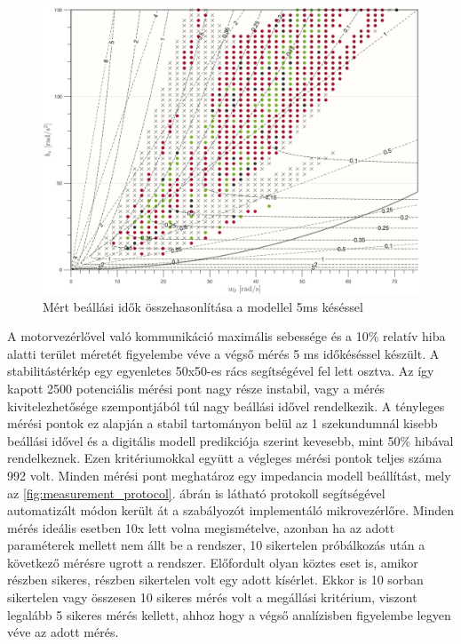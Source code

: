 \begin{figure}[b!]
	\begin{center}
		\includegraphics[width=\textwidth]{images/experiment_comparison_0005.png}
		\caption{Mért beállási idők összehasonlítása a modellel 5ms késéssel}\label{fig:experiment_comparison_0005}
	\end{center}
\end{figure}

A motorvezérlővel való kommunikáció maximális sebessége és a 10\% relatív hiba alatti terület méretét figyelembe véve 
a végső mérés 5 ms időkéséssel készült. A stabilitástérkép egy egyenletes 50x50-es rács segítségével fel lett 
osztva. Az így kapott 2500 potenciális mérési pont nagy része instabil, vagy a mérés kivitelezhetősége szempontjából 
túl nagy beállási idővel rendelkezik. A tényleges mérési pontok ez alapján a stabil tartományon belül az 1 szekundumnál 
kisebb beállási idővel és a digitális modell predikciója szerint kevesebb, mint 50\% hibával rendelkeznek. Ezen kritériumokkal 
együtt a végleges mérési pontok teljes száma 992 volt. Minden mérési pont meghatároz egy impedancia modell beállítást, mely 
az \ref{fig:measurement_protocol}. ábrán is látható protokoll segítségével automatizált módon került át a szabályozót 
implementáló mikrovezérlőre. Minden mérés ideális esetben 10x lett volna megismételve, azonban ha az adott paraméterek mellett 
nem állt be a rendszer, 10 sikertelen próbálkozás után a következő mérésre ugrott a rendszer. Előfordult olyan köztes eset is, 
amikor részben sikeres, részben sikertelen volt egy adott kísérlet. Ekkor is 10 sorban sikertelen vagy összesen 10 sikeres 
mérés volt a megállási kritérium, viszont legalább 5 sikeres mérés kellett, ahhoz hogy a végső analízisben figyelembe legyen 
véve az adott mérés.



